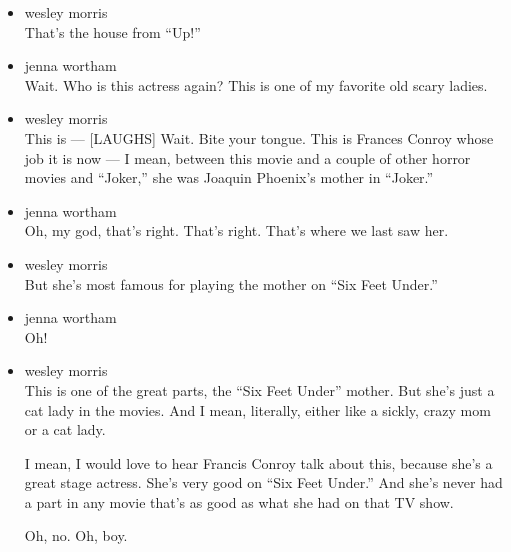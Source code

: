 \begin{itemize}
\item
  wesley morris\\
  That's the house from ``Up!''
\item
  jenna wortham\\
  Wait. Who is this actress again? This is one of my favorite old scary
  ladies.
\item
  wesley morris\\
  This is --- {[}LAUGHS{]} Wait. Bite your tongue. This is Frances
  Conroy whose job it is now --- I mean, between this movie and a couple
  of other horror movies and ``Joker,'' she was Joaquin Phoenix's mother
  in ``Joker.''
\item
  jenna wortham\\
  Oh, my god, that's right. That's right. That's where we last saw her.
\item
  wesley morris\\
  But she's most famous for playing the mother on ``Six Feet Under.''
\item
  jenna wortham\\
  Oh!
\item
  wesley morris\\
  This is one of the great parts, the ``Six Feet Under'' mother. But
  she's just a cat lady in the movies. And I mean, literally, either
  like a sickly, crazy mom or a cat lady.

  I mean, I would love to hear Francis Conroy talk about this, because
  she's a great stage actress. She's very good on ``Six Feet Under.''
  And she's never had a part in any movie that's as good as what she had
  on that TV show.

  Oh, no. Oh, boy.


\end{itemize}
